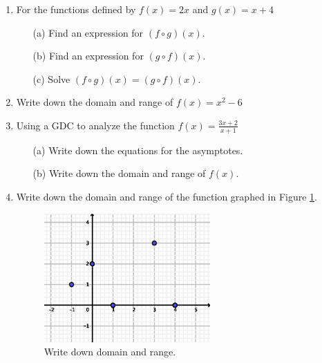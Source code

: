 \documentclass{article}
\begin{document}
\begin{enumerate}
\item For the functions defined by $f(x) = 2x$ and $g(x) = x+4$
\begin{itemize}
    \item[(a)] Find an expression for $(f\circ g)(x)$.
	\item[(b)] Find an expression for $(g\circ f)(x)$.
	\item[(c)] Solve $(f\circ g)(x)=(g\circ f)(x)$.
\end{itemize}

\item Write down the domain and range of $f(x)= x^2-6$

\item Using a GDC to analyze the function $\displaystyle f(x)= \frac {3x+2}{x+1}$
\begin{itemize}
    \item[(a)] Write down the equations for the asymptotes.
	\item[(b)] Write down the domain and range of $f(x)$.
\end{itemize}

\item Write down the domain and range of the function graphed in Figure \ref{domain}.

\begin{figure}[!ht]
    \centering
    \includegraphics[width=0.6\textwidth]{1-4_domain.eps}
    \caption{Write down domain and range. \label{domain}}
\end{figure}


\end{enumerate}
\end{document}
